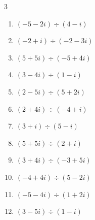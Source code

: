 \begin{multicols}{3}
\begin{enumerate}
  \item $\displaystyle (-5-2i)\div(4-i)$


  \item $\displaystyle (-2+i)\div(-2-3i)$


\columnbreak %

  \item $\displaystyle (5+5i)\div(-5+4i)$


  \item $\displaystyle (3-4i)\div(1-i)$


  \item $\displaystyle (2-5i)\div(5+2i)$

        \phantom{$\displaystyle =-i$}

  \item $\displaystyle (2+4i)\div(-4+i)$


  \item $\displaystyle (3+i)\div(5-i)$


  \item $\displaystyle (5+5i)\div(2+i)$

        \phantom{$\displaystyle =3+i$}

  \item $\displaystyle (3+4i)\div(-3+5i)$


  \item $\displaystyle (-4+4i)\div(5-2i)$


  \item $\displaystyle (-5-4i)\div(1+2i)$


  \item $\displaystyle (3-5i)\div(1-i)$


\end{enumerate}
\end{multicols}
